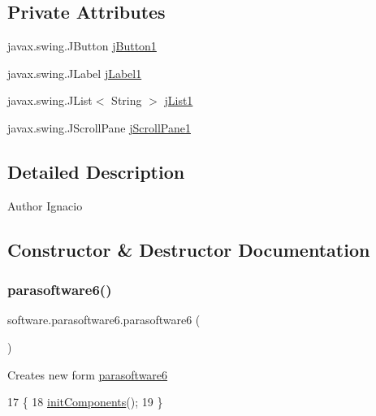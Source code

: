 \subsection*{Private Attributes}
\begin{DoxyCompactItemize}
\item 
javax.\+swing.\+J\+Button \mbox{\hyperlink{classsoftware_1_1parasoftware6_a82af1fccb2dc3615434e773e93577e3e}{j\+Button1}}
\item 
javax.\+swing.\+J\+Label \mbox{\hyperlink{classsoftware_1_1parasoftware6_a4c4a13bf028651697609279d113c6103}{j\+Label1}}
\item 
javax.\+swing.\+J\+List$<$ String $>$ \mbox{\hyperlink{classsoftware_1_1parasoftware6_a591d2c040c5b906d0df174fa5ae460dc}{j\+List1}}
\item 
javax.\+swing.\+J\+Scroll\+Pane \mbox{\hyperlink{classsoftware_1_1parasoftware6_a1ce3e9e74a88099c65ad960cee26aa87}{j\+Scroll\+Pane1}}
\end{DoxyCompactItemize}


\subsection{Detailed Description}
\begin{DoxyAuthor}{Author}
Ignacio 
\end{DoxyAuthor}


\subsection{Constructor \& Destructor Documentation}
\mbox{\label{classsoftware_1_1parasoftware6_a6fb366aeceab3c73f162d273e6b2565e}} 
\subsubsection{\texorpdfstring{parasoftware6()}{parasoftware6()}}
{\footnotesize\ttfamily software.\+parasoftware6.\+parasoftware6 (\begin{DoxyParamCaption}{ }\end{DoxyParamCaption})\hspace{0.3cm}{\ttfamily [inline]}}

Creates new form \mbox{\hyperlink{classsoftware_1_1parasoftware6}{parasoftware6}} 
\begin{DoxyCode}
17                            \{
18         \mbox{\hyperlink{classsoftware_1_1parasoftware6_a7e8012356c324152156d2bea5c2cc82f}{initComponents}}();
19     \}
\end{DoxyCode}


